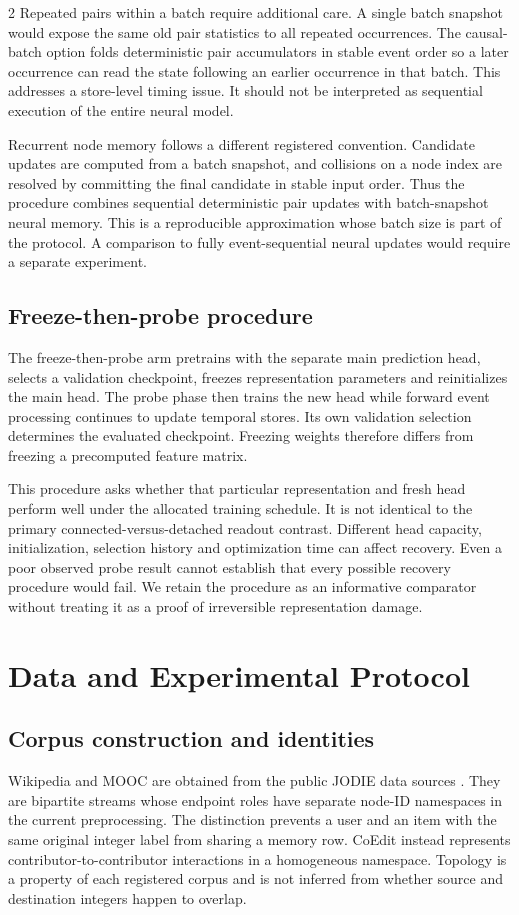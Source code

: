 \documentclass[a4paper,10pt]{article}
\begin{document}
\begin{multicols}{2}
Repeated pairs within a batch require additional care. A single batch snapshot would expose the same old pair statistics to all repeated occurrences. The causal-batch option folds deterministic pair accumulators in stable event order so a later occurrence can read the state following an earlier occurrence in that batch. This addresses a store-level timing issue. It should not be interpreted as sequential execution of the entire neural model.

Recurrent node memory follows a different registered convention. Candidate updates are computed from a batch snapshot, and collisions on a node index are resolved by committing the final candidate in stable input order. Thus the procedure combines sequential deterministic pair updates with batch-snapshot neural memory. This is a reproducible approximation whose batch size is part of the protocol. A comparison to fully event-sequential neural updates would require a separate experiment.

\subsection{Freeze-then-probe procedure}
The freeze-then-probe arm pretrains with the separate main prediction head, selects a validation checkpoint, freezes representation parameters and reinitializes the main head. The probe phase then trains the new head while forward event processing continues to update temporal stores. Its own validation selection determines the evaluated checkpoint. Freezing weights therefore differs from freezing a precomputed feature matrix.

This procedure asks whether that particular representation and fresh head perform well under the allocated training schedule. It is not identical to the primary connected-versus-detached readout contrast. Different head capacity, initialization, selection history and optimization time can affect recovery. Even a poor observed probe result cannot establish that every possible recovery procedure would fail. We retain the procedure as an informative comparator without treating it as a proof of irreversible representation damage.

\section{Data and Experimental Protocol}
\subsection{Corpus construction and identities}
Wikipedia and MOOC are obtained from the public JODIE data sources \cite{jodie}. They are bipartite streams whose endpoint roles have separate node-ID namespaces in the current preprocessing. The distinction prevents a user and an item with the same original integer label from sharing a memory row. CoEdit instead represents contributor-to-contributor interactions in a homogeneous namespace. Topology is a property of each registered corpus and is not inferred from whether source and destination integers happen to overlap.


\end{multicols}
\end{document}

